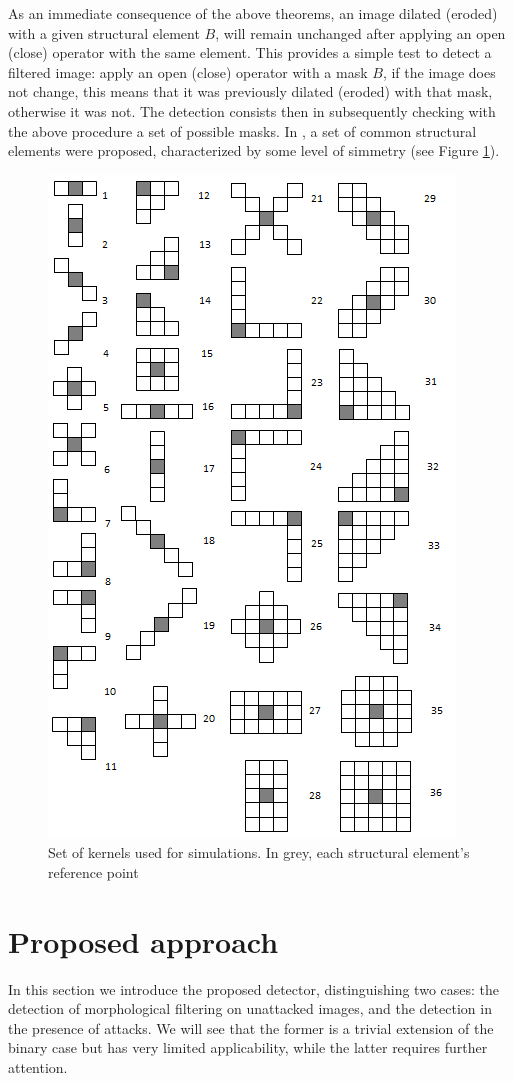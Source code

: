 \documentclass[review]{elsarticle}
\begin{document}
As an immediate consequence of the above theorems, an image dilated (eroded) with a given structural element $B$, will remain unchanged after applying an open (close) operator with the same element. This provides a simple test to detect a filtered image: apply an open (close) operator with a mask $B$, if the image does not change, this means that it was previously dilated (eroded) with that mask, otherwise it was not. The detection consists then in subsequently checking with the above procedure a set of possible masks. In \cite{de2017detecting}, a set of common structural elements were proposed, characterized by some level of simmetry (see Figure \ref{fig:masks}).

\begin{figure}[!ht]
	\centering
	\includegraphics[width=0.7\linewidth]{masks.png}
	\caption{Set of kernels used for simulations. In grey, each structural element's reference point}
	\label{fig:masks}
\end{figure}

\section{Proposed approach}
In this section we introduce the proposed detector, distinguishing two cases: the detection of morphological filtering on unattacked images, and the detection in the presence of attacks. We will see that the former is a trivial extension of the binary case but has very limited applicability, while the latter requires further attention.
\end{document}
